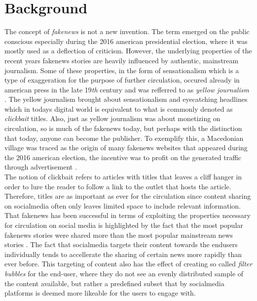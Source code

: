 \documentclass{article}
\begin{document}
\section{Background}
The concept of {\it fakenews} is not a new invention. The term emerged on the public conscious especially during the 2016 american presidential election, where it was mostly used as a deflection of criticism. However, the underlying properties of the recent years fakenews stories are heavily influenced by authentic, mainstream journalism. Some of these properties, in the form of sensationalism which is a type of exaggeration for the purpose of further circulation, occured already in american press in the late 19{\it th} century and was refferred to as {\it yellow journalism} \cite{spencer2007yellow}. The yellow journalism brought about sensationalism and eyecatching headlines which in todays digital world is equivalent to what is commonly denoted as {\it clickbait} titles. Also, just as yellow journalism was about monetizing on circulation, so is much of the fakenews today, but perhaps with the distinction that today, anyone can become the publisher. To exemplify this, a Macedonian village was traced as the origin of many fakenews websites that appeared during the 2016 american election, the incentive was to profit on the generated traffic through advertisement \cite{bbc_mcdVillage}. \\
The notion of clickbait refers to articles with titles that leaves a cliff hanger in order to lure the reader to follow a link to the outlet that hosts the article. Therefore, titles are as important as ever for the circulation since content sharing on socialmedia often only leaves limited space to include relevant information. That fakenews has been successful in terms of exploiting the properties necessary for circulation on social media is highlighted by the fact that the most popular fakenews stories were shared more than the most popular mainstream news stories \cite{allcott2017social}. The fact that socialmedia targets their content towards the endusers individually tends to accellerate the sharing of certain news more rapidly than ever before. This targeting of content also has the effect of creating so called {\it filter bubbles} for the end-user, where they do not see an evenly distributed sample of the content available, but rather a predefined subset that by socialmedia platforms is deemed more likeable for the users to engage with. 
\\\\
\end{document}
